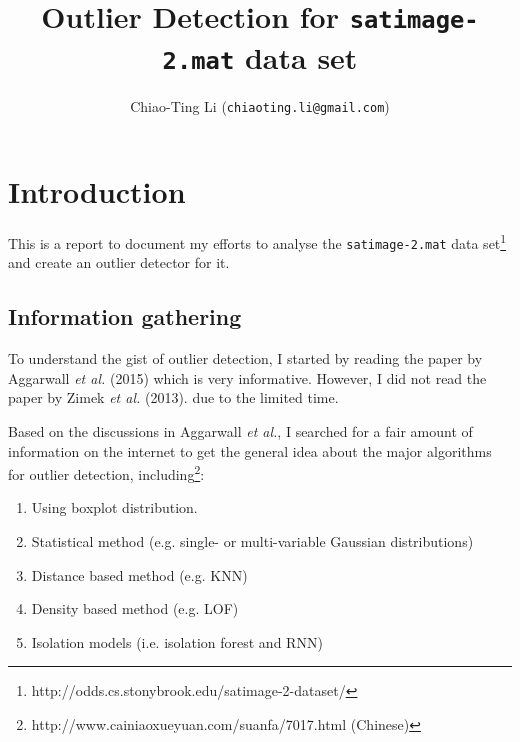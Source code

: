 \documentclass[12pt]{article}
\title{Outlier Detection for \texttt{satimage-2.mat} data set}
\author{Chiao-Ting Li (\texttt{chiaoting.li@gmail.com})}
\date{}
\begin{document}
\maketitle

\vspace{-5ex}
\section{Introduction}

This is a report to document my efforts to analyse the \texttt{satimage-2.mat} data set\footnote{http://odds.cs.stonybrook.edu/satimage-2-dataset/}
and create an outlier detector for it.

\subsection{Information gathering}
To understand the gist of outlier detection, I started by reading the paper by Aggarwall \textit{et al.} (2015)
which is very informative. However, I did not read the paper by Zimek \textit{et al.} (2013). due to the limited time.

Based on the discussions in Aggarwall \textit{et al.}, I searched for a fair amount of information on the internet
to get the general idea about the major algorithms for outlier detection, including\footnote{http://www.cainiaoxueyuan.com/suanfa/7017.html (Chinese)}:
\vspace{-1ex}
\begin{enumerate}
	\itemsep0em
	\item Using boxplot distribution.
	\item Statistical method (e.g. single- or multi-variable Gaussian distributions)
	\item Distance based method (e.g. KNN)
	\item Density based method (e.g. LOF)
	\item Isolation models (i.e. isolation forest and RNN)
\end{enumerate}
\end{document}
